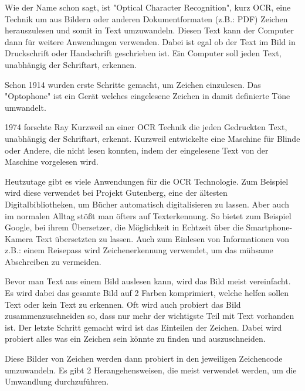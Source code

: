 \label{sec:ocr}


Wie der Name schon sagt, ist "Optical Character Recognition", kurz OCR, eine Technik um aus Bildern oder anderen Dokumentformaten (z.B.: PDF) Zeichen herauszulesen und somit in Text umzuwandeln. Diesen Text kann der Computer dann für weitere Anwendungen verwenden. Dabei ist egal ob der Text im Bild in Druckschrift oder Handschrift geschrieben ist. Ein Computer soll jeden Text, unabhängig der Schriftart, erkennen.


Schon 1914 wurden erste Schritte gemacht, um Zeichen einzulesen. Das "Optophone" ist ein Gerät welches eingelesene Zeichen in damit definierte Töne umwandelt.

1974 forschte Ray Kurzweil an einer OCR Technik die jeden Gedruckten Text, unabhängig der Schriftart, erkennt. Kurzweil entwickelte eine Maschine für Blinde oder Andere, die nicht lesen konnten, indem der eingelesene Text von der Maschine vorgelesen wird.

Heutzutage gibt es viele Anwendungen für die OCR Technologie. Zum Beispiel wird diese verwendet bei Projekt Gutenberg, eine der ältesten Digitalbibliotheken, um Bücher automatisch digitalisieren zu lassen. Aber auch im normalen Alltag stößt man öfters auf Texterkennung. So bietet zum Beispiel Google, bei ihrem Übersetzer, die Möglichkeit in Echtzeit über die Smartphone-Kamera Text übersetzten zu lassen. Auch zum Einlesen von Informationen von z.B.: einem Reisepass wird Zeichenerkennung verwendet, um das mühsame Abschreiben zu vermeiden.


Bevor man Text aus einem Bild auslesen kann, wird das Bild meist vereinfacht. Es wird dabei das gesamte Bild auf 2 Farben komprimiert, welche helfen sollen Text oder kein Text zu erkennen. Oft wird auch probiert das Bild zusammenzuschneiden so, dass nur mehr der wichtigste Teil mit Text vorhanden ist. Der letzte Schritt gemacht wird ist das Einteilen der Zeichen. Dabei wird probiert alles was ein Zeichen sein könnte zu finden und auszuschneiden.

Diese Bilder von Zeichen werden dann probiert in den jeweiligen Zeichencode
umzuwandeln. Es gibt 2 Herangehensweisen, die meist verwendet werden, um die Umwandlung durchzuführen.


